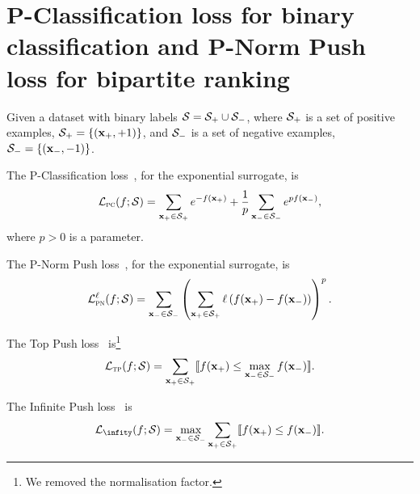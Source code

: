 \section{P-Classification loss for binary classification and P-Norm Push loss for bipartite ranking}
\label{sec:binary}

Given a dataset with binary labels $\mathcal{S} = \mathcal{S}_+ \cup \mathcal{S}_-$, where $\mathcal{S}_+$ is a set of positive examples, 
\ie $\mathcal{S}_+ = \{(\mathbf{x}_+, +1)\}$, and $\mathcal{S}_-$ is a set of negative examples, \ie $\mathcal{S}_- = \{(\mathbf{x}_-, -1)\}$.

The P-Classification loss~\cite{ertekin2011equivalence}, for the exponential surrogate, is
\begin{equation*}
\mathcal{L}_\textsc{pc}(f; \mathcal{S}) 
= \sum_{\mathbf{x}_+ \in \mathcal{S}_+} e^{-f(\mathbf{x}_+)} + \frac{1}{p} \sum_{\mathbf{x}_- \in \mathcal{S}_-} e^{p f(\mathbf{x}_-)},
\end{equation*}
where $p > 0$ is a parameter.

The P-Norm Push loss~\cite{rudin2009p}, for the exponential surrogate, is
\begin{equation*}
\mathcal{L}_\textsc{pn}^\ell (f; \mathcal{S})
= \sum_{\mathbf{x}_- \in \mathcal{S}_-} \left( \sum_{\mathbf{x}_+ \in \mathcal{S}_+} \ell \left( f(\mathbf{x}_+) - f(\mathbf{x}_-) \right) \right)^p.
\end{equation*}

The Top Push loss~\cite{li2014top} is\footnote{We removed the normalisation factor.}
\begin{equation*}
\mathcal{L}_\textsc{tp}(f; \mathcal{S})
= \sum_{\mathbf{x}_+ \in \mathcal{S}_+} \llbracket f(\mathbf{x}_+) \le \max_{\mathbf{x}_- \in \mathcal{S}_-} f(\mathbf{x}_-) \rrbracket.
\end{equation*}

The Infinite Push loss~\cite{rudin2009p} is
\begin{equation*}
\LCal_\infity(f; \SCal)
= \max_{\x_- \in \SCal_-} \sum_{\x_+ \in \SCal_+} \llb f(\x_+) \le f(\x_-) \rrb.
\end{equation*}

